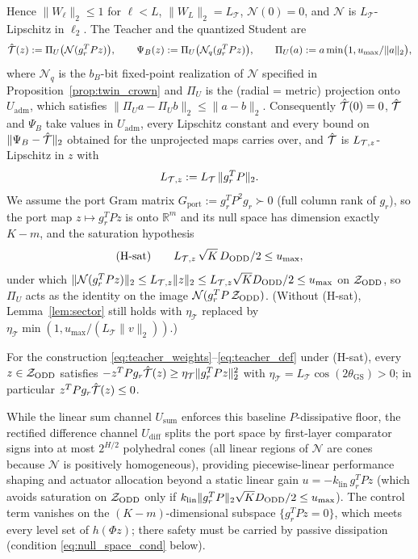 Hence \(\|W_\ell\|_2 \le 1\) for \(\ell < L\), \(\|W_L\|_2 = L_{\mathcal{T}}\), \(\mathcal{N}(0) = 0\), and \(\mathcal{N}\) is \(L_{\mathcal{T}}\)-Lipschitz in \(\ell_2\). The Teacher and the quantized Student are
\begin{equation}
\label{eq:teacher_def}
\hat{\mathcal{T}}(z) := \Pi_U\big(\mathcal{N}(g_r^TPz)\big), \qquad \Psi_B(z) := \Pi_U\big(\mathcal{N}_q(g_r^TPz)\big), \qquad \Pi_U(a) := a\min\!\big(1, u_{\max}/\|a\|_2\big),
\end{equation}
where \(\mathcal{N}_q\) is the \(b_B\)-bit fixed-point realization of \(\mathcal{N}\) specified in Proposition~\ref{prop:twin_crown} and \(\Pi_U\) is the (radial = metric) projection onto \(U_{\mathrm{adm}}\), which satisfies \(\|\Pi_U a - \Pi_U b\|_2 \le \|a - b\|_2\). Consequently \(\hat{\mathcal{T}}(0) = 0\), \(\hat{\mathcal{T}}\) and \(\Psi_B\) take values in \(U_{\mathrm{adm}}\), every Lipschitz constant and every bound on \(\|\Psi_B - \hat{\mathcal{T}}\|_2\) obtained for the unprojected maps carries over, and \(\hat{\mathcal{T}}\) is \(L_{\mathcal{T},z}\)-Lipschitz in \(z\) with
\begin{equation}
\label{eq:LTz}
L_{\mathcal{T},z} := L_{\mathcal{T}}\,\|g_r^T P\|_2 .
\end{equation}
We assume the port Gram matrix \(G_{\mathrm{port}} := g_r^TP^2g_r \succ 0\) (full column rank of \(g_r\)), so the port map \(z \mapsto g_r^TPz\) is onto \(\mathbb{R}^m\) and its null space has dimension exactly \(K-m\), and the saturation hypothesis
\begin{equation}
\label{eq:sat_cond}
\text{(H-sat)}\qquad L_{\mathcal{T},z}\,\sqrt{K}\,D_{\mathrm{ODD}}/2 \le u_{\max},
\end{equation}
under which \(\|\mathcal{N}(g_r^TPz)\|_2 \le L_{\mathcal{T},z}\|z\|_2 \le L_{\mathcal{T},z}\sqrt{K}D_{\mathrm{ODD}}/2 \le u_{\max}\) on \(\mathcal{Z}_{\mathrm{ODD}}\), so \(\Pi_U\) acts as the identity on the image \(\mathcal{N}(g_r^TP\,\mathcal{Z}_{\mathrm{ODD}})\). (Without (H-sat), Lemma~\ref{lem:sector} still holds with \(\eta_{\mathcal{T}}\) replaced by \(\eta_{\mathcal{T}}\min(1, u_{\max}/(L_{\mathcal{T}}\|v\|_2))\).)

\begin{lemma}
\label{lem:sector}
For the construction \eqref{eq:teacher_weights}--\eqref{eq:teacher_def} under (H-sat), every \(z \in \mathcal{Z}_{\mathrm{ODD}}\) satisfies
\(-z^T P g_r \hat{\mathcal{T}}(z) \ge \eta_{\mathcal{T}}\|g_r^T P z\|_2^2\) with \(\eta_{\mathcal{T}} = L_{\mathcal{T}}\cos(2\theta_{\mathrm{GS}}) > 0\); in particular \(z^TPg_r\hat{\mathcal{T}}(z) \le 0\).
\end{lemma}

While the linear sum channel \(U_{\mathrm{sum}}\) enforces this baseline \(P\)-dissipative floor, the rectified difference channel \(U_{\mathrm{diff}}\) splits the port space by first-layer comparator signs into at most \(2^{H/2}\) polyhedral cones (all linear regions of \(\mathcal{N}\) are cones because \(\mathcal{N}\) is positively homogeneous), providing piecewise-linear performance shaping and actuator allocation beyond a static linear gain \(u = -k_{\mathrm{lin}}\,g_r^T P z\) (which avoids saturation on \(\mathcal{Z}_{\mathrm{ODD}}\) only if \(k_{\mathrm{lin}}\|g_r^TP\|_2\sqrt{K}D_{\mathrm{ODD}}/2 \le u_{\max}\)). The control term vanishes on the \((K-m)\)-dimensional subspace \(\{g_r^TPz = 0\}\), which meets every level set of \(h(\Phi z)\); there safety must be carried by passive dissipation (condition \eqref{eq:null_space_cond} below).

